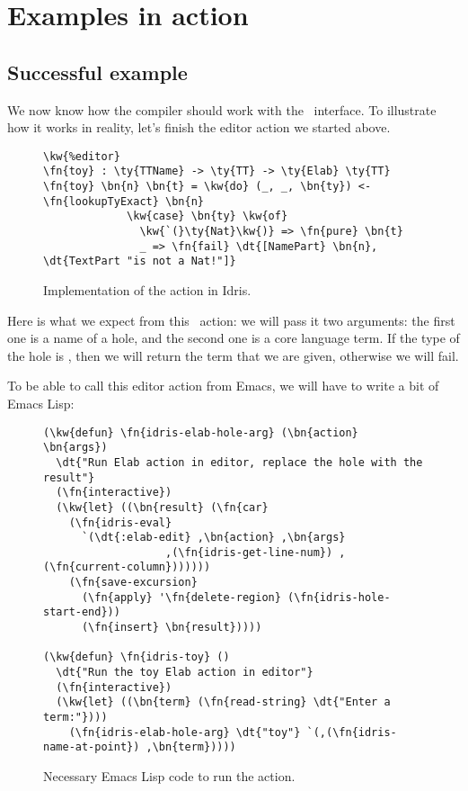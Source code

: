 \section{Examples in action}\label{sec:designExample}

\subsection{Successful example}

We now know how the compiler should work with the \Editorable\ interface.
To illustrate how it works in reality, let's finish the  editor action
we started above.

\begin{figure}[ht]
\caption{Implementation of the  action in Idris.}
\begin{Verbatim}[framesep=2mm, label=\footnotesize{\normalfont{Idris}}, labelposition=topline]
\kw{%editor}
\fn{toy} : \ty{TTName} -> \ty{TT} -> \ty{Elab} \ty{TT}
\fn{toy} \bn{n} \bn{t} = \kw{do} (_, _, \bn{ty}) <- \fn{lookupTyExact} \bn{n}
             \kw{case} \bn{ty} \kw{of}
               \kw{`(}\ty{Nat}\kw{)} => \fn{pure} \bn{t}
               _ => \fn{fail} \dt{[NamePart} \bn{n}, \dt{TextPart "is not a Nat!"]}
\end{Verbatim}
\end{figure}

Here is what we expect from this \Elab\ action: we will pass it two arguments:
the first one is a name of a hole, and the second one is a core language term.
If the type of the hole is , then we will return the term that we are
given, otherwise we will fail.

To be able to call this editor action from Emacs, we will have to write a bit
of Emacs Lisp:

\begin{figure}[ht]
\caption{Necessary Emacs Lisp code to run the  action.}
\label{code:elispToy}
\begin{Verbatim}[framesep=2mm, label=\footnotesize{\normalfont{Emacs Lisp}}, labelposition=topline]
(\kw{defun} \fn{idris-elab-hole-arg} (\bn{action} \bn{args})
  \dt{"Run Elab action in editor, replace the hole with the result"}
  (\fn{interactive})
  (\kw{let} ((\bn{result} (\fn{car}
    (\fn{idris-eval}
      `(\dt{:elab-edit} ,\bn{action} ,\bn{args}
                   ,(\fn{idris-get-line-num}) ,(\fn{current-column}))))))
    (\fn{save-excursion}
      (\fn{apply} '\fn{delete-region} (\fn{idris-hole-start-end}))
      (\fn{insert} \bn{result}))))

(\kw{defun} \fn{idris-toy} ()
  \dt{"Run the toy Elab action in editor"}
  (\fn{interactive})
  (\kw{let} ((\bn{term} (\fn{read-string} \dt{"Enter a term:"})))
    (\fn{idris-elab-hole-arg} \dt{"toy"} `(,(\fn{idris-name-at-point}) ,\bn{term}))))
\end{Verbatim}
\end{figure}

